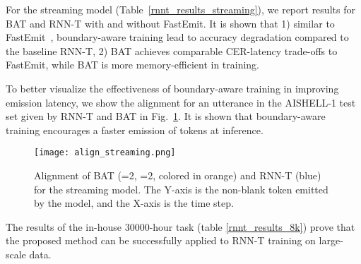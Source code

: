 \documentclass{INTERSPEECH2023}
\begin{document}
For the streaming model (Table~\ref{rnnt_results_streaming}), we report results for BAT and RNN-T with and without FastEmit. It is shown that 1) similar to FastEmit~\cite{kim2021reducing, Delay-penalized}, boundary-aware training lead to accuracy degradation compared to the baseline RNN-T, 2) BAT achieves comparable CER-latency trade-offs to FastEmit, while BAT is more memory-efficient in training.


To better visualize the effectiveness of boundary-aware training in improving emission latency, we show the alignment for an utterance in the AISHELL-1 test set given by RNN-T and BAT in Fig.~\ref{fig:curve}. It is shown that boundary-aware training encourages a faster emission of tokens at inference.

\begin{figure}[!ht]
  \centering
  \texttt{[image: align\_streaming.png]}
  \caption{Alignment of BAT (=2, =2, colored in orange) and RNN-T (blue) for the streaming model. The Y-axis is the non-blank token emitted by the model, and the X-axis is the time step.}
  \label{fig:curve}
\end{figure}

The results of the in-house 30000-hour task (table \ref{rnnt_results_8k}) prove that the proposed method can be successfully applied to RNN-T training on large-scale data. 
\begin{table}[!ht]
\caption{The results of RNN-T and BAT (=2, =2) on the industrial 30000-hour task.}
\begin{threeparttable}
	\centering
\end{threeparttable}
\label{rnnt_results_8k}
\end{table}
\end{document}

